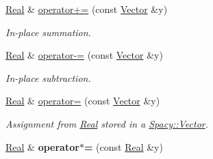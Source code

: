 \begin{DoxyCompactItemize}
\hyperlink{classSpacy_1_1Real}{Real} \& \hyperlink{classSpacy_1_1Real_aeca0f6ac9782bbce5b4e435a639fd177_aeca0f6ac9782bbce5b4e435a639fd177}{operator+=} (const \hyperlink{classSpacy_1_1Vector}{Vector} \&y)
\begin{DoxyCompactList}\small\item\em In-\/place summation. \end{DoxyCompactList}\item 
\hyperlink{classSpacy_1_1Real}{Real} \& \hyperlink{classSpacy_1_1Real_aac0d2fafb532c8c3448a08e10ec1d5cf_aac0d2fafb532c8c3448a08e10ec1d5cf}{operator-\/=} (const \hyperlink{classSpacy_1_1Vector}{Vector} \&y)
\begin{DoxyCompactList}\small\item\em In-\/place subtraction. \end{DoxyCompactList}\item 
\hyperlink{classSpacy_1_1Real}{Real} \& \hyperlink{classSpacy_1_1Real_aed6727526ee908df0a64fd0d84bf8eee_aed6727526ee908df0a64fd0d84bf8eee}{operator=} (const \hyperlink{classSpacy_1_1Vector}{Vector} \&y)
\begin{DoxyCompactList}\small\item\em Assignment from \hyperlink{classSpacy_1_1Real}{Real} stored in a \hyperlink{classSpacy_1_1Vector}{Spacy\+::\+Vector}. \end{DoxyCompactList}\item 
\hypertarget{classSpacy_1_1Real_a9df988fec4985a0c7103dc0d9c070b2f}{}\hyperlink{classSpacy_1_1Real}{Real} \& {\bfseries operator$\ast$=} (const \hyperlink{classSpacy_1_1Real}{Real} \&y)\label{classSpacy_1_1Real_a9df988fec4985a0c7103dc0d9c070b2f}


\end{DoxyCompactItemize}
